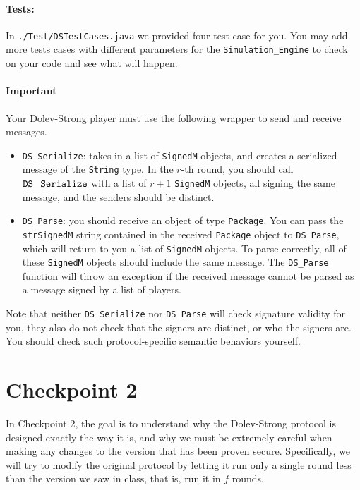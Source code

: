 \paragraph{Tests:}
In {\tt ./Test/DSTestCases.java} we provided four test case for you. You may add more tests cases with different parameters for the {\tt Simulation\_Engine} to check on your code and see what will happen.

\paragraph{Important}
Your Dolev-Strong player must use the following wrapper to send and receive messages.
\begin{itemize}
    \item {\tt DS\_Serialize}: takes in
          a list of {\tt SignedM} objects, and creates a serialized message
          of the {\tt String} type.
          In the $r$-th round, you should call ${\tt DS\_Serialize}$
          with a list of $r + 1$
          {\tt SignedM} objects, all signing the same message, and
          the senders should be distinct.

    \item {\tt DS\_Parse}:
          you should receive an object of type {\tt Package}.
          You can pass the {\tt strSignedM} string contained in the received {\tt Package} object
          to {\tt DS\_Parse}, which will return to you
          a list of {\tt SignedM} objects.
          To parse correctly, all of these {\tt SignedM} objects should include the same message.
          The {\tt DS\_Parse} function
          will throw an exception if the received message
          cannot be parsed %
          as a message signed by a list of players.
\end{itemize}

Note that neither {\tt DS\_Serialize}
nor {\tt DS\_Parse} will check signature validity for you,
they also do not check that the signers are distinct, or who the signers
are. You should check such protocol-specific semantic behaviors yourself.

\section{Checkpoint 2}
\label{sec:cp2}

In Checkpoint 2, the goal is to understand why the Dolev-Strong protocol is designed exactly the way it is, and why we must be extremely careful when making any changes to the version that has been proven secure. Specifically, we will try to modify the original protocol by letting it run only a single round less than the version we saw in class, that is, run it in $f$ rounds. 

